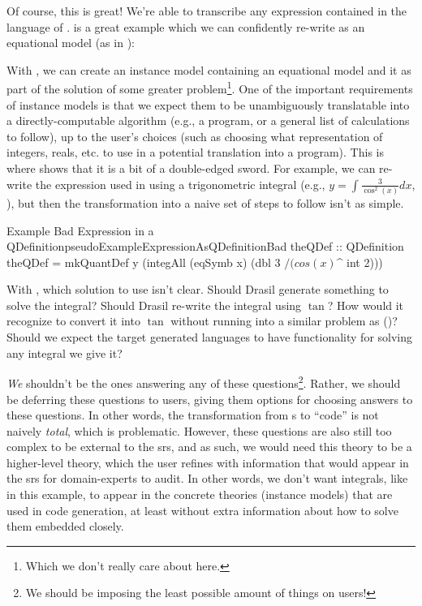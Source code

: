 \pseudoExampleExpression{}

Of course, this is great! We're able to transcribe any expression contained in
the language of \Expr{}.  is a great example which
we can confidently re-write as an equational model (as in
):


With , we can create an instance
model containing an equational model and it as part of the
solution of some greater problem\footnote{Which we don't really care about
here.}. One of the important requirements of instance models is that we expect
them to be unambiguously translatable into a directly-computable algorithm
(e.g., a program, or a general list of calculations to follow), up to the user's
choices (such as choosing what representation of integers, reals, etc. to use in
a potential translation into a program). This is where \Expr{} shows that it is
a bit of a double-edged sword. For example, we can re-write the expression used
in  using a trigonometric
integral (e.g., $y = \int {}dx$,
), but then the transformation
into a naive set of steps to follow isn't as simple.

\begin{pseudohaskell}{Example Bad Expression in a QDefinition}{pseudoExampleExpressionAsQDefinitionBad}
theQDef :: QDefinition
theQDef = mkQuantDef y (integAll (eqSymb x) (dbl 3 $/ (cos (x) $^ int 2)))
\end{pseudohaskell}

With , which solution to use
isn't clear. Should Drasil generate something to solve the integral? Should
Drasil re-write the integral using $\tan$? How would it recognize to convert it
into $\tan$ without running into a similar problem as \relToQD{}
()? Should we expect the target generated languages to
have functionality for solving any integral we give it?

\textit{We} shouldn't be the ones answering any of these questions\footnote{We
should be imposing the least possible amount of things on users!}. Rather, we
should be deferring these questions to users, giving them options for choosing
answers to these questions. In other words, the transformation from \Expr{}s to
``code'' is not naively \textit{total}, which is problematic. However, these
questions are also still too complex to be external to the \acs{srs}, and as
such, we would need this theory to be a higher-level theory, which the user
refines with information that would appear in the \acs{srs} for domain-experts
to audit. In other words, we don't want integrals, like in this example, to
appear in the concrete theories (instance models) that are used in code
generation, at least without extra information about how to solve them embedded
closely.

